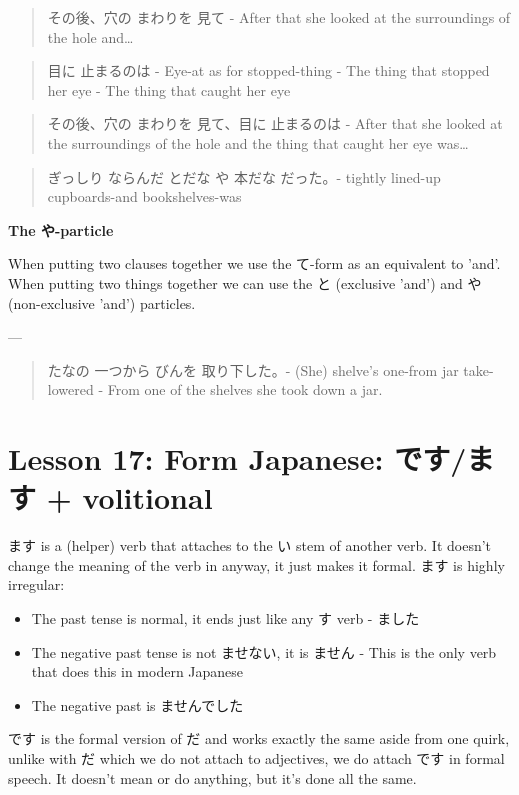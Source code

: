 \documentclass[11pt]{article}
\begin{document}
\begin{quote}
その後、穴の まわりを 見て - After that she looked at the surroundings of the hole and\ldots{}
\end{quote}

\begin{quote}
目に 止まるのは - Eye-at as for stopped-thing - The thing that stopped her eye - The thing that caught her eye
\end{quote}

\begin{quote}
その後、穴の まわりを 見て、目に 止まるのは - After that she looked at the surroundings of the hole and the thing that caught her eye was\ldots{}
\end{quote}

\begin{quote}
ぎっしり ならんだ とだな や 本だな だった。- tightly lined-up cupboards-and bookshelves-was
\end{quote}

\textbf{The や-particle}

When putting two clauses together we use the て-form as an equivalent to 'and'. When putting two things together we can use the と (exclusive 'and') and や (non-exclusive 'and') particles.

---

\begin{quote}
たなの 一つから びんを 取り下した。- (She) shelve's one-from jar take-lowered - From one of the shelves she took down a jar.
\end{quote}

\section{Lesson 17: Form Japanese: です/ます + volitional}
\label{sec:orgb1cd604}
ます is a (helper) verb that attaches to the い stem of another verb. It doesn't change the meaning of the verb in anyway, it just makes it formal. ます is highly irregular:
\begin{itemize}
\item The past tense is normal, it ends just like any す verb - ました
\item The negative past tense is not ませない, it is ません - This is the only verb that does this in modern Japanese
\item The negative past is ませんでした
\end{itemize}

です is the formal version of だ and works exactly the same aside from one quirk, unlike with だ which we do not attach to adjectives, we do attach です in formal speech. It doesn't mean or do anything, but it's done all the same.
\end{document}
